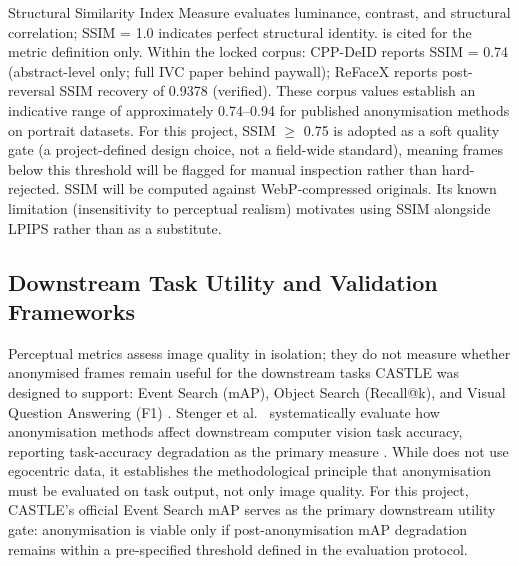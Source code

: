 \documentclass[12pt, onecolumn]{IEEEtran}
\begin{document}
Structural Similarity Index Measure \cite{wang2004ssim} evaluates
luminance, contrast, and structural correlation; SSIM = 1.0 indicates
perfect structural identity. \cite{wang2004ssim} is cited for the metric
definition only. Within the locked corpus: CPP-DeID
\cite{meden2023cppdeidentification} reports SSIM = 0.74 (abstract-level
only; full IVC paper behind paywall); ReFaceX \cite{muhammad2026refacex}
reports post-reversal SSIM recovery of 0.9378 \cite{muhammad2026refacex}
(verified). These corpus values establish an indicative range of
approximately 0.74--0.94 for published anonymisation methods on portrait
datasets. For this project, SSIM $\geq$ 0.75 is adopted as a soft
quality gate (a project-defined design choice, not a field-wide
standard), meaning frames below this threshold will be flagged for
manual inspection rather than hard-rejected. SSIM will be computed
against WebP-compressed originals. Its known limitation (insensitivity
to perceptual realism) motivates using SSIM alongside LPIPS rather than
as a substitute.

\subsection{Downstream Task Utility and Validation Frameworks}

Perceptual metrics assess image quality in isolation; they do not
measure whether anonymised frames remain useful for the downstream tasks
CASTLE was designed to support: Event Search (mAP), Object Search
(Recall@k), and Visual Question Answering (F1)
\cite{rossetto2025castle}. Stenger et al.\ \cite{stenger2025evaluating}
systematically evaluate how anonymisation methods affect downstream
computer vision task accuracy, reporting task-accuracy degradation as
the primary measure \cite{stenger2025evaluating}. While
\cite{stenger2025evaluating} does not use egocentric data, it
establishes the methodological principle that anonymisation must be
evaluated on task output, not only image quality. For this project,
CASTLE's official Event Search mAP serves as the primary downstream
utility gate: anonymisation is viable only if post-anonymisation mAP
degradation remains within a pre-specified threshold defined in the
evaluation protocol.
\end{document}
